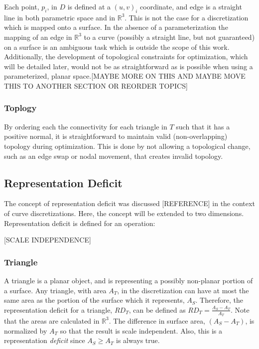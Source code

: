 \documentclass[11pt]{article}
\begin{document}
Each point, $p_i$, in $D$ is defined at a $\left(u,v\right)_i$
coordinate, and edge is a straight line in both parametric space and in
${\mathbb R}^3$. This is not the case for a discretization which is
mapped onto a surface. In the absence of a parameterization the mapping
of an edge in ${\mathbb R}^3$ to a curve (possibly a straight line, but
    not guaranteed) on a surface is an ambiguous task which is outside
the scope of this work. Additionally, the development of topological
constraints for optimization, which will be detailed later, would not be
as straightforward as is possible when using a parameterized, planar
space.[MAYBE MORE ON THIS AND MAYBE MOVE THIS TO ANOTHER SECTION OR
REORDER TOPICS]

\subsubsection{Toplogy}
By ordering each the connectivity for each triangle in $T$ such that it
has a positive normal, it is straightforward to maintain valid
(non-overlapping) topology during optimization. This is done by not
allowing a topological change, such as an edge swap or nodal movement,
that creates invalid topology.

\subsection{Representation Deficit}
The concept of representation deficit was discussed [REFERENCE] in the
context of curve discretizations. Here, the concept will be extended to
two dimensions. Representation deficit is defined for an operation:

[SCALE INDEPENDENCE]

\subsubsection{Triangle}
A triangle is a planar object, and is representing a possibly non-planar
portion of a surface. Any triangle, with area $A_T$, in the
discretization can have at most the same area as the portion of the
surface which it represents, $A_S$. Therefore, the representation
deficit for a triangle, $RD_T$, can be defined as $RD_T = \frac{A_S -
A_T}{A_T}$. Note that the areas are calculated in ${\mathbb R}^3$. The
difference in surface area, $\left(A_S - A_T\right)$, is normalized by
$A_T$ so that the result is scale independent. Also, this is a
representation {\it deficit} since $A_S \ge A_T$ is always true.
\end{document}
